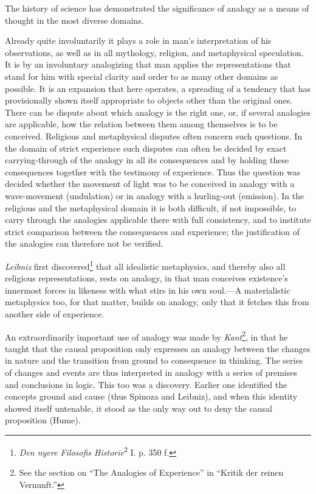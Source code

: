 \documentclass[12pt,a4paper]{book}
\newcommand{\opage}[1]{\marginnote{\footnotesize\textit{[#1]}}}
\begin{document}
The history of science has demonstrated the significance of analogy as a
means of thought in the most diverse domains.

Already quite involuntarily it plays a role in man's interpretation of his
observations, as well as in all mythology, religion, and metaphysical
speculation. It is by an involuntary analogizing that man applies the
representations that stand for him with special clarity and order to as many
other domains as possible. It is an expansion that here operates, a spreading
of a tendency that has provisionally shown itself appropriate to objects
other than the original ones. There can be dispute about which analogy is the
right one, or, if several analogies are applicable, how the relation between
them among themselves is to be conceived. Religious and metaphysical disputes
often concern such questions. In the domain of strict experience such
disputes can often be decided by exact carrying-through of the analogy in all
its consequences and by holding these consequences together with the
testimony of experience. Thus \opage{183}the question was decided whether the movement
of light was to be conceived in analogy with a wave-movement (undulation) or
in analogy with a hurling-out (emission). In the religious and the
metaphysical domain it is both difficult, if not impossible, to carry through
the analogies applicable there with full consistency, and to institute strict
comparison between the consequences and experience; the justification of the
analogies can therefore not be verified.

\emph{Leibniz} first discovered\footnote{\emph{Den nyere Filosofis
Historie}\textsuperscript{2} I. p. 350 f.} that all idealistic metaphysics,
and thereby also all religious representations, rests on analogy, in that man
conceives existence's innermost forces in likeness with what stirs in his own
soul.---A materialistic metaphysics too, for that matter, builds on analogy,
only that it fetches this from another side of experience.

An extraordinarily important use of analogy was made by \emph{Kant}\footnote{See
the section on ``The Analogies of Experience'' in ``Kritik der reinen
Vernunft.''}, in that he taught that the causal proposition only expresses an
analogy between the changes in nature and the transition from ground to
consequence in thinking. The series of changes and events are thus
interpreted in analogy with a series of premises and conclusions in logic.
This too was a discovery. Earlier one identified the concepts ground and
cause (thus Spinoza and Leibniz), and when this identity showed itself
untenable, it stood as the only way out to deny the causal proposition
(Hume).
\end{document}
